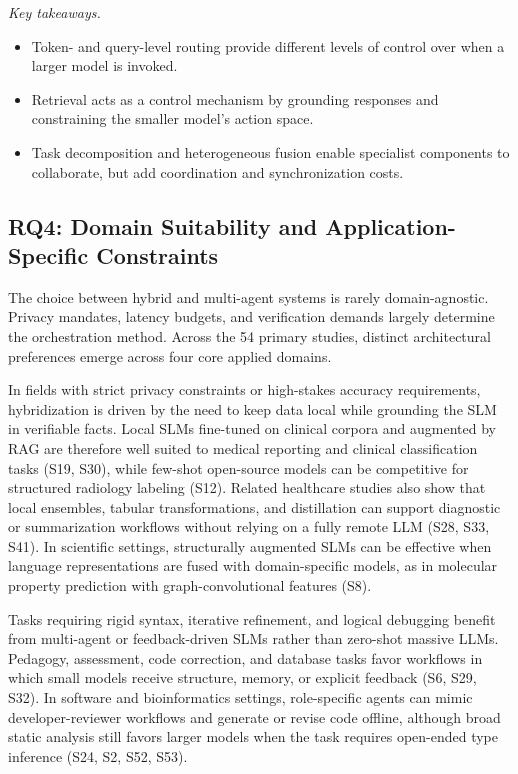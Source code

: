 \begin{samepage}
\smallskip\noindent\textit{Key takeaways.}
\begin{itemize}
    \item Token- and query-level routing provide different levels of control over when a larger model is invoked.
    \item Retrieval acts as a control mechanism by grounding responses and constraining the smaller model's action space.
    \item Task decomposition and heterogeneous fusion enable specialist components to collaborate, but add coordination and synchronization costs.
\end{itemize}
\end{samepage}

\subsection{RQ4: Domain Suitability and Application-Specific Constraints}
\label{sec:rq4}
The choice between hybrid and multi-agent systems is rarely domain-agnostic. Privacy mandates, latency budgets, and verification demands largely determine the orchestration method. Across the 54 primary studies, distinct architectural preferences emerge across four core applied domains.

In fields with strict privacy constraints or high-stakes accuracy requirements, hybridization is driven by the need to keep data local while grounding the SLM in verifiable facts. Local SLMs fine-tuned on clinical corpora and augmented by RAG are therefore well suited to medical reporting and clinical classification tasks (S19, S30), while few-shot open-source models can be competitive for structured radiology labeling (S12). Related healthcare studies also show that local ensembles, tabular transformations, and distillation can support diagnostic or summarization workflows without relying on a fully remote LLM (S28, S33, S41). In scientific settings, structurally augmented SLMs can be effective when language representations are fused with domain-specific models, as in molecular property prediction with graph-convolutional features (S8).

Tasks requiring rigid syntax, iterative refinement, and logical debugging benefit from multi-agent or feedback-driven SLMs rather than zero-shot massive LLMs. Pedagogy, assessment, code correction, and database tasks favor workflows in which small models receive structure, memory, or explicit feedback (S6, S29, S32). In software and bioinformatics settings, role-specific agents can mimic developer-reviewer workflows and generate or revise code offline, although broad static analysis still favors larger models when the task requires open-ended type inference (S24, S2, S52, S53).

